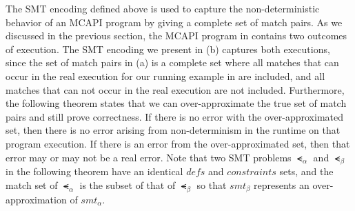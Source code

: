 The SMT encoding defined above is used to capture the non-deterministic behavior of an MCAPI program by giving a complete set of match pairs. As we discussed in the previous section, the MCAPI program in  contains two outcomes of execution. The SMT encoding we present in (b) captures both executions, since the set of match pairs in (a) is a complete set where all matches that can occur in the real execution for our running example in  are included, and all matches that can not occur in the real execution are not included. Furthermore, the following theorem states that we can over-approximate the true set of match pairs and still prove correctness. If there is no error with the over-approximated set, then there is no error arising from non-determinism in the runtime on that program execution. If there is an error from the over-approximated set, then that error may or may not be a real error. Note that two SMT problems $\smt_{\alpha}$ and $\smt_{\beta}$ in the following theorem have an identical $\mathit{defs}$ and $\mathit{constraints}$ sets, and the match set of $\smt_{\alpha}$ is the subset of that of $\smt_{\beta}$ so that $smt_{\beta}$ represents an over-approximation of $smt_{\alpha}$.

